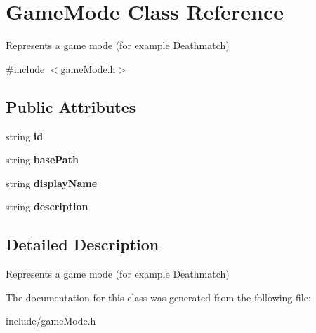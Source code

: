 \hypertarget{classGameMode}{
\section{\-Game\-Mode \-Class \-Reference}
\label{d7/dc4/classGameMode}
}


\-Represents a game mode (for example \-Deathmatch)  




{\ttfamily \#include $<$game\-Mode.\-h$>$}

\subsection*{\-Public \-Attributes}
\begin{DoxyCompactItemize}
\item 
\hypertarget{classGameMode_a6b9e7f41b954832ed4d0791d125165ba}{
string {\bfseries id}}
\label{d7/dc4/classGameMode_a6b9e7f41b954832ed4d0791d125165ba}

\item 
\hypertarget{classGameMode_aff1c614d0be40e62d4c8aba255628d3b}{
string {\bfseries base\-Path}}
\label{d7/dc4/classGameMode_aff1c614d0be40e62d4c8aba255628d3b}

\item 
\hypertarget{classGameMode_a1cd54f66583be4428ca019b99ef88677}{
string {\bfseries display\-Name}}
\label{d7/dc4/classGameMode_a1cd54f66583be4428ca019b99ef88677}

\item 
\hypertarget{classGameMode_a8b5173dc76d2cf084551d0b0f9aa02c9}{
string {\bfseries description}}
\label{d7/dc4/classGameMode_a8b5173dc76d2cf084551d0b0f9aa02c9}

\end{DoxyCompactItemize}


\subsection{\-Detailed \-Description}
\-Represents a game mode (for example \-Deathmatch) 

\-The documentation for this class was generated from the following file\-:\begin{DoxyCompactItemize}
\item 
include/game\-Mode.\-h\end{DoxyCompactItemize}
